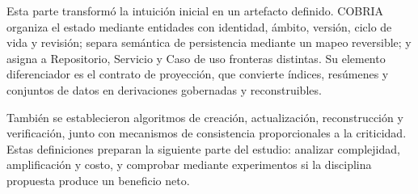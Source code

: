 Esta parte transformó la intuición inicial en un artefacto definido. COBRIA organiza el
estado mediante entidades con identidad, ámbito, versión, ciclo de vida y revisión;
separa semántica de persistencia mediante un mapeo reversible; y asigna a Repositorio,
Servicio y Caso de uso fronteras distintas. Su elemento diferenciador es el contrato de
proyección, que convierte índices, resúmenes y conjuntos de datos en derivaciones gobernadas y
reconstruibles.

También se establecieron algoritmos de creación, actualización, reconstrucción y
verificación, junto con mecanismos de consistencia proporcionales a la criticidad. Estas
definiciones preparan la siguiente parte del estudio: analizar complejidad, amplificación
y costo, y comprobar mediante experimentos si la disciplina propuesta produce un
beneficio neto.
